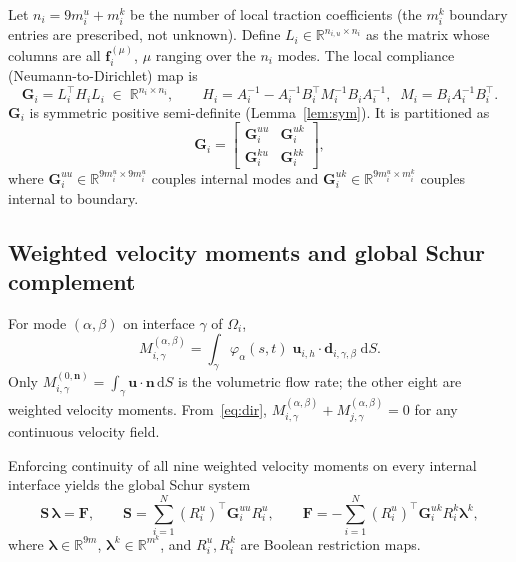 \documentclass[11pt,a4paper]{article}
\newcommand{\R}{\mathbb{R}}
\newcommand{\pore}[1]{\Omega_{#1}}
\newcommand{\vel}{\bm{u}}
\newcommand{\normal}{\bm{n}}
\newcommand{\trac}{\bm{\lambda}}
\newcommand{\DtN}{\mathbf{G}}
\newcommand{\Schur}{\mathbf{S}}
\newcommand{\loadvec}{\bm{f}}
\begin{document}
Let $n_i = 9m_i^u + m_i^k$ be the number of local traction coefficients
(the $m_i^k$ boundary entries are prescribed, not unknown).
Define $L_i \in \R^{n_{i,u} \times n_i}$ as the matrix whose columns are all
$\loadvec_i^{(\mu)}$, $\mu$ ranging over the $n_i$ modes.
The local compliance (Neumann-to-Dirichlet) map is
\begin{equation}\label{eq:dtn}
  \DtN_i = L_i^\top H_i L_i \;\in\; \R^{n_i \times n_i},\qquad
  H_i = A_i^{-1} - A_i^{-1}B_i^\top M_i^{-1}B_i A_i^{-1},\;\;
  M_i = B_i A_i^{-1}B_i^\top.
\end{equation}
$\DtN_i$ is symmetric positive semi-definite (Lemma~\ref{lem:sym}).
It is partitioned as
\[
  \DtN_i =
  \begin{bmatrix}
    \DtN_i^{uu} & \DtN_i^{uk} \\
    \DtN_i^{ku} & \DtN_i^{kk}
  \end{bmatrix},
\]
where $\DtN_i^{uu} \in \R^{9m_i^u \times 9m_i^u}$ couples internal modes
and $\DtN_i^{uk} \in \R^{9m_i^u \times m_i^k}$ couples internal to boundary.

\subsection{Weighted velocity moments and global Schur complement}

For mode $(\alpha,\beta)$ on interface $\gamma$ of $\pore{i}$,
\begin{equation}\label{eq:moment}
  M_{i,\gamma}^{(\alpha,\beta)}
  = \int_{\gamma} \varphi_\alpha(s,t)\;
    \vel_{i,h} \cdot \bm{d}_{i,\gamma,\beta} \;\mathrm{d}S.
\end{equation}
Only $M_{i,\gamma}^{(0,\normal)} = \int_\gamma \vel\cdot\normal\,\mathrm{d}S$
is the volumetric flow rate; the other eight are weighted velocity moments.
From~\eqref{eq:dir}, $M_{i,\gamma}^{(\alpha,\beta)}
+ M_{j,\gamma}^{(\alpha,\beta)} = 0$ for any continuous velocity field.

Enforcing continuity of all nine weighted velocity moments on every internal
interface yields the global Schur system
\begin{equation}\label{eq:schur}
  \Schur\,\trac = \bm{F},\qquad
  \Schur = \sum_{i=1}^N (R_i^u)^\top \DtN_i^{uu} R_i^u,\qquad
  \bm{F} = -\sum_{i=1}^N (R_i^u)^\top \DtN_i^{uk} R_i^k \trac^k,
\end{equation}
where $\trac \in \R^{9m}$, $\trac^k \in \R^{m^k}$, and $R_i^u,R_i^k$
are Boolean restriction maps.

\end{document}
